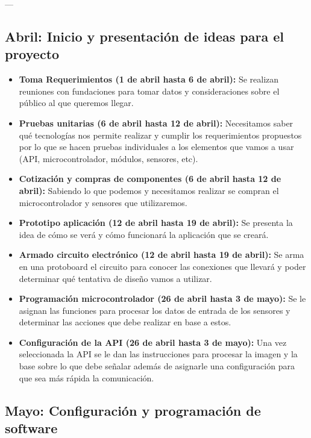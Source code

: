 \documentclass{article}
\begin{document}
---

\subsection*{Abril: Inicio y presentación de ideas para el proyecto}

\begin{itemize}
    \item\textbf{Toma Requerimientos (1 de abril hasta 6 de abril):} Se realizan reuniones con fundaciones para tomar datos y consideraciones sobre el público al que queremos llegar.
    
    \item\textbf{Pruebas unitarias (6 de abril hasta 12 de abril):} Necesitamos saber qué tecnologías nos permite realizar y cumplir los requerimientos propuestos por lo que se hacen pruebas individuales a los elementos que vamos a usar (API, microcontrolador, módulos, sensores, etc).
    
    \item\textbf{Cotización y compras de componentes (6 de abril hasta 12 de abril):} Sabiendo lo que podemos y necesitamos realizar se compran el microcontrolador y sensores que utilizaremos.
    
    \item\textbf{Prototipo aplicación (12 de abril hasta 19 de abril):} Se presenta la idea de cómo se verá y cómo funcionará la aplicación que se creará.
    
    \item\textbf{Armado circuito electrónico (12 de abril hasta 19 de abril):} Se arma en una protoboard el circuito para conocer las conexiones que llevará y poder determinar qué tentativa de diseño vamos a utilizar.
    
    \item\textbf{Programación microcontrolador (26 de abril hasta 3 de mayo):} Se le asignan las funciones para procesar los datos de entrada de los sensores y determinar las acciones que debe realizar en base a estos.
    
    \item \textbf{Configuración de la API (26 de abril hasta 3 de mayo):} Una vez seleccionada la API se le dan las instrucciones para procesar la imagen y la base sobre lo que debe señalar además de asignarle una configuración para que sea más rápida la comunicación.
\end{itemize}

\subsection*{Mayo: Configuración y programación de software}
\end{document}

